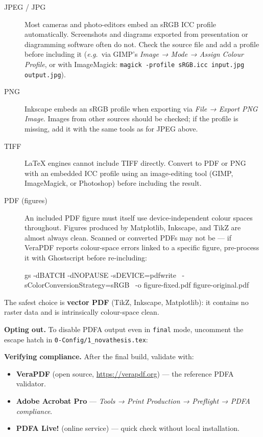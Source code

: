 \begin{description}
  \item[JPEG / JPG] Most cameras and photo-editors embed an sRGB ICC
    profile automatically.  Screenshots and diagrams exported from
    presentation or diagramming software often do not.  Check the
    source file and add a profile before including it (\emph{e.g.}\ via
    GIMP's \emph{Image → Mode → Assign Colour Profile}, or with
    ImageMagick: \verb!magick -profile sRGB.icc input.jpg output.jpg!).

  \item[PNG] Inkscape embeds an sRGB profile when exporting via
    \emph{File → Export PNG Image}.  Images from other sources should be
    checked; if the profile is missing, add it with the same tools as
    for JPEG above.

  \item[TIFF] \LaTeX{} engines cannot include TIFF directly.  Convert
    to PDF or PNG with an embedded ICC profile using an image-editing
    tool (GIMP, ImageMagick, or Photoshop) before including the result.

  \item[PDF (figures)] An included PDF figure must itself use
    device-independent colour spaces throughout.  Figures produced by
    Matplotlib, Inkscape, and TikZ are almost always clean.  Scanned
    or converted PDFs may not be — if VeraPDF reports colour-space
    errors linked to a specific figure, pre-process it with Ghostscript
    before re-including:
\begin{bashcode}
gs -dBATCH -dNOPAUSE -sDEVICE=pdfwrite \
   -sColorConversionStrategy=sRGB \
   -o figure-fixed.pdf figure-original.pdf
\end{bashcode}
\end{description}

\noindent The safest choice is \textbf{vector PDF} (TikZ, Inkscape,
Matplotlib): it contains no raster data and is intrinsically
colour-space clean.

\medskip
\noindent\textbf{Opting out.}
To disable \gls{PDFA} output even in \texttt{final} mode, uncomment the escape
hatch in \verb!0-Config/1_novathesis.tex!:

\begin{latexcode}
\end{latexcode}

\noindent\textbf{Verifying compliance.}
After the final build, validate with:
\begin{itemize}
  \item \textbf{VeraPDF} (open source, \url{https://verapdf.org}) —
        the reference \gls{PDFA} validator.
  \item \textbf{Adobe Acrobat Pro} — \emph{Tools → Print Production →
        Preflight → \gls{PDFA} compliance}.
  \item \textbf{\gls{PDFA} Live!} (online service) — quick check without local
        installation.
\end{itemize}

